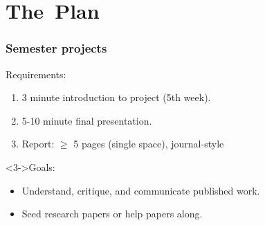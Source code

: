 










\section{The\ Plan}


\begin{frame}
  \frametitle{Semester projects}

  \begin{block}{Requirements:}
    \begin{enumerate}
    \item<1-> 
      3 minute introduction to project (5th week).
    \item<2-> 
      5-10 minute final presentation.
    \item<2->
      Report: $\ge$ 5 pages (single space), journal-style
    \end{enumerate}
  \end{block}

  \begin{block}<3->{Goals:}
    \begin{itemize}
    \item 
      Understand, critique, and communicate published work.
    \item 
      Seed research papers or help papers along.
    \end{itemize}
  \end{block}

\end{frame}


